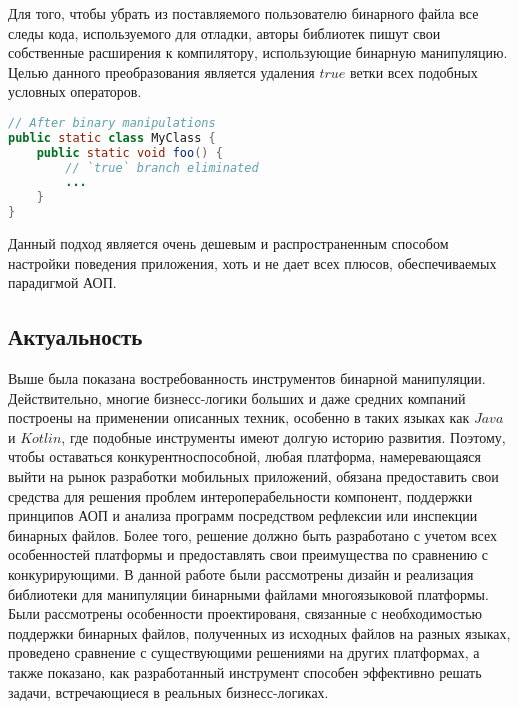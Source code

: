 Для того, чтобы убрать из поставляемого пользователю бинарного файла все следы кода, используемого для отладки, авторы библиотек пишут свои собственные расширения к компилятору, использующие бинарную манипуляцию. Целью данного преобразования является удаления $true$ ветки всех подобных условных операторов.

\begin{lstlisting}[language=Java, caption=Результат работы преобразования, label=lst:debug]
// After binary manipulations
public static class MyClass {
    public static void foo() {
        // `true` branch eliminated
        ...
    }
}
\end{lstlisting}

Данный подход является очень дешевым и распространенным способом настройки поведения приложения, хоть и не дает всех плюсов, обеспечиваемых парадигмой АОП.

\subsection{Актуальность}

Выше была показана востребованность инструментов бинарной манипуляции. Действительно, многие бизнесс-логики больших и даже средних компаний построены на применении описанных техник, особенно в таких языках как $Java$ и $Kotlin$, где подобные инструменты имеют долгую историю развития. Поэтому, чтобы оставаться конкурентноспособной, любая платформа, намеревающаяся выйти на рынок разработки мобильных приложений, обязана предоставить свои средства для решения проблем интероперабельности компонент, поддержки принципов АОП и анализа программ посредством рефлексии или инспекции бинарных файлов. Более того, решение должно быть разработано с учетом всех особенностей платформы и предоставлять свои преимущества по сравнению с конкурирующими. В данной работе были рассмотрены дизайн и реализация библиотеки для манипуляции бинарными файлами многоязыковой платформы. Были рассмотрены особенности проектированя, связанные с необходимостью поддержки бинарных файлов, полученных из исходных файлов на разных языках, проведено сравнение с существующими решениями на других платформах, а также показано, как разработанный инструмент способен эффективно решать задачи, встречающиеся в реальных бизнесс-логиках.

\newpage
